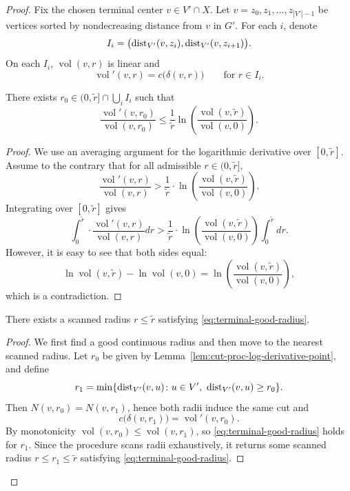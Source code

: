 \begin{proof}
Fix the chosen terminal center $v\in V'\cap X$. Let
$v=z_0,z_1,\dots,z_{|V'|-1}$ be vertices sorted by nondecreasing
distance from $v$ in $G'$. For each $i$, denote
\[
I_i=\bigl(\text{dist}_{V'}(v,z_i),\text{dist}_{V'}(v,z_{i+1})\bigr).
\]
On each $I_i$, $\operatorname{vol}(v,r)$ is linear and 
\[
\operatorname{vol}'(v,r)=c\bigl(\delta(v,r)\bigr)
\qquad\text{for }r\in I_i.
\]

\begin{lemma}\label{lem:cut-proc-log-derivative-point}
There exists $r_0\in (0,\tilde r]\cap\bigcup_i I_i$ such that
\[
\frac{\operatorname{vol}'(v,r_0)}{\operatorname{vol}(v,r_0)}
\le
\frac{1}{\tilde r}
\ln\left(\frac{\operatorname{vol}(v,\tilde r)}{\operatorname{vol}(v,0)}\right).
\]
\end{lemma}
\begin{proof}
We use an averaging argument for the logarithmic derivative over $[0,\tilde r]$.
Assume to the contrary that for all admissible $r\in(0,\tilde r]$,
\[
\frac{\operatorname{vol}'(v,r)}{\operatorname{vol}(v,r)}
>
\frac{1}{\tilde r}\cdot
\ln\left(\frac{\operatorname{vol}(v,\tilde r)}{\operatorname{vol}(v,0)}\right).
\]
Integrating over $[0,\tilde r]$ gives
\[
\int_0^{\tilde r}\cdot\frac{\operatorname{vol}'(v,r)}{\operatorname{vol}(v,r)}dr
>
\frac{1}{\tilde r}\cdot
\ln\left(\frac{\operatorname{vol}(v,\tilde r)}{\operatorname{vol}(v,0)}\right)
\int_0^{\tilde r}dr.
\]
However, it is easy to see that both sides equal:
\[
\ln\operatorname{vol}(v,\tilde r)-\ln\operatorname{vol}(v,0)
=
\ln\left(\frac{\operatorname{vol}(v,\tilde r)}{\operatorname{vol}(v,0)}\right),
\]
which is a contradiction.
\end{proof}

\begin{lemma}\label{lem:cut-proc-scanned-radius}
There exists a scanned  radius $r\le \tilde r$ satisfying \eqref{eq:terminal-good-radius}.
\end{lemma}
\begin{proof}
We first find a good continuous radius and then move to the nearest scanned radius.
Let $r_0$ be given by Lemma~\ref{lem:cut-proc-log-derivative-point}, and define
\[
r_1=\min\{\text{dist}_{V'}(v,u)\colon u\in V',\ \text{dist}_{V'}(v,u)\ge r_0\}.
\]
Then $N(v,r_0)=N(v,r_1)$, hence both radii induce the same cut and
\[
c\bigl(\delta(v,r_1)\bigr)=\operatorname{vol}'(v,r_0).
\]
By monotonicity $\operatorname{vol}(v,r_0)\le \operatorname{vol}(v,r_1)$, so \eqref{eq:terminal-good-radius} holds for $r_1$. Since the procedure scans radii exhaustively, it returns some scanned radius $r\le r_1\le \tilde r$ satisfying \eqref{eq:terminal-good-radius}.
\end{proof}


\end{proof}
